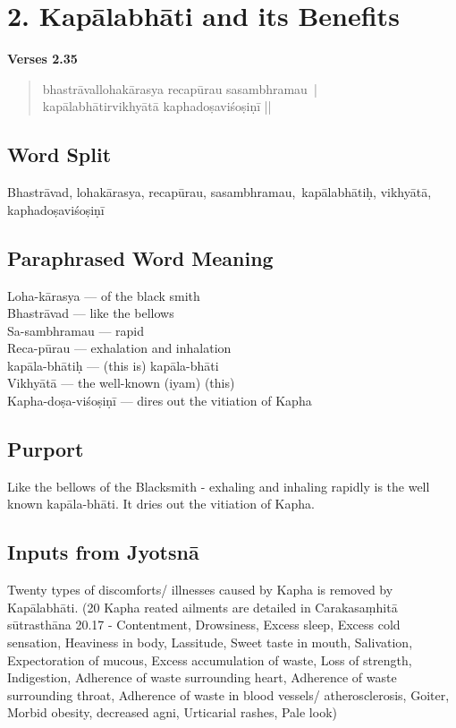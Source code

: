 \section*{2. Kapālabhāti and its Benefits}

\noindent \textbf{Verses 2.35}

\begin{verse}
bhastrāvallohakārasya recapūrau sasambhramau |\\
kapālabhātirvikhyātā kaphadoṣaviśoṣiṇī ||
\end{verse}

\subsection*{Word Split}


Bhastrāvad, lohakārasya, recapūrau, sasambhramau, kapālabhātiḥ, vikhyātā, kaphadoṣaviśoṣiṇī

\subsection*{Paraphrased Word Meaning}


\begin{multicols}{2}
Loha-kārasya --- of the black smith \\
Bhastrāvad --- like the bellows \\
Sa-sambhramau --- rapid\\
Reca-pūrau --- exhalation and inhalation \\
kapāla-bhātiḥ --- (this is) kapāla-bhāti\\
Vikhyātā --- the well-known (iyam) (this)\\
Kapha-doṣa-viśoṣiṇī --- dires out the vitiation of Kapha 
\end{multicols}

\subsection*{Purport}


Like the bellows of the Blacksmith - exhaling and inhaling rapidly is the well known kapāla-bhāti. It dries out the vitiation of Kapha.

\subsection*{Inputs from Jyotsnā}


Twenty types of discomforts/ illnesses caused by Kapha is removed by Kapālabhāti. (20 Kapha reated ailments are detailed in  Carakasaṃhitā sūtrasthāna 20.17  -  Contentment, Drowsiness, Excess sleep, Excess cold sensation, Heaviness in body, Lassitude, Sweet taste in mouth, Salivation, Expectoration of mucous, Excess accumulation of waste, Loss of strength, Indigestion, Adherence of waste surrounding heart, Adherence of waste surrounding throat, Adherence of waste in blood vessels/ atherosclerosis, Goiter, Morbid obesity, decreased agni, Urticarial rashes, Pale look)
